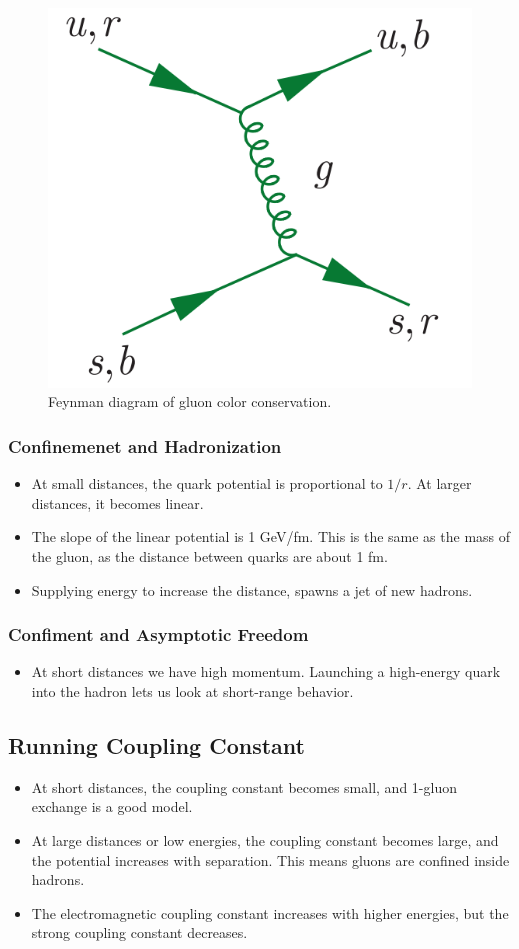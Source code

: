 \begin{figure}[h!]
\centering
\includegraphics[width = .5\textwidth]{gluon_color_conservation.png}
\caption{Feynman diagram of gluon color conservation.}
\label{fig: gluon_color_conservation}
\end{figure}

\subsubsection{Confinemenet and Hadronization}
\begin{itemize}
    \item At small distances, the quark potential is proportional to $1 / r$. At larger distances, it becomes linear. 
    \item The slope of the linear potential is 1 GeV/fm. This is the same as the mass of the gluon, as the distance between quarks are about 1 fm.
    \item Supplying energy to increase the distance, spawns a jet of new hadrons. 
\end{itemize}

\subsubsection{Confiment and Asymptotic Freedom}
\begin{itemize}
    \item At short distances we have high momentum. Launching a high-energy quark into the hadron lets us look at short-range behavior.
\end{itemize}

\subsection{Running Coupling Constant}
\begin{itemize}
    \item At short distances, the coupling constant becomes small, and 1-gluon exchange is a good model. 
    \item At large distances or low energies, the coupling constant becomes large, and the potential increases with separation. This means gluons are confined inside hadrons. 
    \item The electromagnetic coupling constant increases with higher energies, but the strong coupling constant decreases.
\end{itemize}

